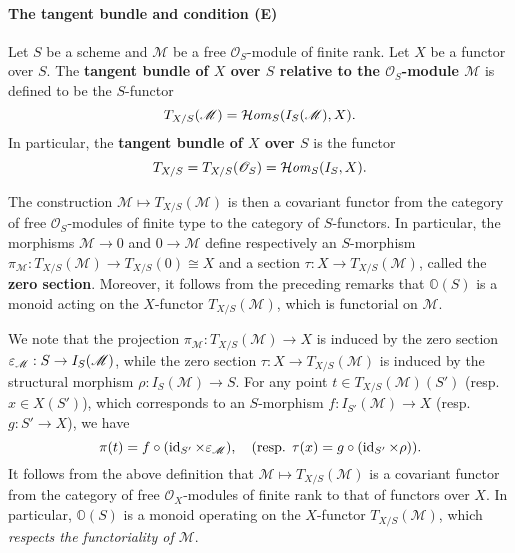 \paragraph{The tangent bundle and condition (E)}
\begin{definition}
Let $S$ be a scheme and $\mathscr{M}$ be a free $\mathscr{O}_S$-module of finite rank. Let $X$ be a functor over $S$. The \textbf{tangent bundle of $X$ over $S$ relative to the $\mathscr{O}_S$-module $\mathscr{M}$} is defined to be the $S$-functor
\[T_{X/S}(\mathscr{M})=\operatorname{\mathcal{H}\hspace*{-0.4pt}\textit{om}\hspace{0.5pt}}_S(I_S(\mathscr{M}),X).\]
In particular, the \textbf{tangent bundle of $X$ over $S$} is the functor
\[T_{X/S}=T_{X/S}(\mathscr{O}_S)=\operatorname{\mathcal{H}\hspace*{-0.4pt}\textit{om}\hspace{0.5pt}}_S(I_S,X).\]
\end{definition}

The construction $\mathscr{M}\mapsto T_{X/S}(\mathscr{M})$ is then a covariant functor from the category of free $\mathscr{O}_S$-modules of finite type to the category of $S$-functors. In particular, the morphisms $\mathscr{M}\to 0$ and $0\to\mathscr{M}$ define respectively an $S$-morphism $\pi_\mathscr{M}:T_{X/S}(\mathscr{M})\to T_{X/S}(0)\cong X$ and a section $\tau:X\to T_{X/S}(\mathscr{M})$, called the \textbf{zero section}. Moreover, it follows from the preceding remarks that $\mathbb{O}(S)$ is a monoid acting on the $X$-functor $T_{X/S}(\mathscr{M})$, which is functorial on $\mathscr{M}$.

\begin{remark}\label{scheme tangent bundle projection zero section char}
We note that the projection $\pi_\mathscr{M}:T_{X/S}(\mathscr{M})\to X$ is induced by the zero section $\varepsilon_\mathscr{M}:S\to I_S(\mathscr{M})$, while the zero section $\tau:X\to T_{X/S}(\mathscr{M})$ is induced by the structural morphism $\rho:I_S(\mathscr{M})\to S$. For any point $t\in T_{X/S}(\mathscr{M})(S')$ (resp. $x\in X(S')$), which corresponds to an $S$-morphism $f:I_{S'}(\mathscr{M})\to X$ (resp. $g:S'\to X$), we have 
\[\pi(t)=f\circ(\operatorname{id}_{S'}\times\varepsilon_\mathscr{M}),\quad  \text{(resp. $\tau(x)=g\circ(\operatorname{id}_{S'}\times\rho)$)}.\]
It follows from the above definition that $\mathscr{M}\mapsto T_{X/S}(\mathscr{M})$ is a covariant functor from the category of free $\mathscr{O}_X$-modules of finite rank to that of functors over $X$. In particular, $\mathbb{O}(S)$ is a monoid operating on the $X$-functor $T_{X/S}(\mathscr{M})$, which \textit{respects the functoriality of $\mathscr{M}$}.
\end{remark}

